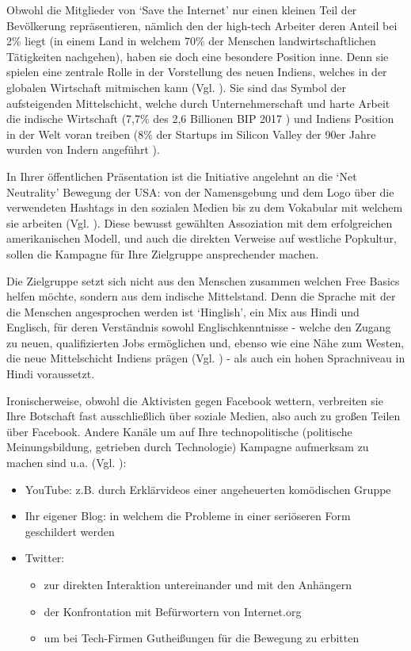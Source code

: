 \documentclass{article}
\begin{document}
\medskip

Obwohl die Mitglieder von `Save the Internet' nur einen kleinen Teil der Bevölkerung repräsentieren, nämlich den der high-tech Arbeiter deren Anteil bei 2\% liegt (in einem Land in welchem 70\% der Menschen landwirtschaftlichen Tätigkeiten nachgehen), haben sie doch eine besondere Position inne. Denn sie spielen eine zentrale Rolle in der Vorstellung des neuen Indiens, welches in der globalen Wirtschaft mitmischen kann (Vgl. \cite{thomas2012}).
Sie sind das Symbol der aufsteigenden Mittelschicht, welche durch Unternehmerschaft und harte Arbeit die indische Wirtschaft (7,7\% des 2,6 Billionen BIP 2017 \autocite{statistaIndiaGDP}\autocite{imfIndiaGDP}) und Indiens Position in der Welt voran treiben (8\% der Startups im Silicon Valley der 90er Jahre wurden von Indern angeführt \parencite{upadhya2004}).

\medskip

In Ihrer öffentlichen Präsentation ist die Initiative angelehnt an die `Net Neutrality' Bewegung der USA: von der Namensgebung und dem Logo über die verwendeten Hashtags in den sozialen Medien bis zu dem Vokabular mit welchem sie arbeiten (Vgl. \cite{prasad2017}).
Diese bewusst gewählten Assoziation mit dem erfolgreichen amerikanischen Modell, und auch die direkten Verweise auf westliche Popkultur, sollen die Kampagne für Ihre Zielgruppe ansprechender machen.

Die Zielgruppe setzt sich nicht aus den Menschen zusammen welchen Free Basics helfen möchte, sondern aus dem indische Mittelstand. Denn die Sprache mit der die Menschen angesprochen werden ist `Hinglish', ein Mix aus Hindi und Englisch, für deren Verständnis sowohl Englischkenntnisse - welche den Zugang zu neuen, qualifizierten Jobs ermöglichen und, ebenso wie eine Nähe zum Westen, die neue Mittelschicht Indiens prägen (Vgl. \cite{fernandes2006}) - als auch ein hohen Sprachniveau in Hindi voraussetzt.

\medskip

Ironischerweise, obwohl die Aktivisten gegen Facebook wettern, verbreiten sie Ihre Botschaft fast ausschließlich über soziale Medien, also auch zu großen Teilen über Facebook. Andere Kanäle um auf Ihre technopolitische (politische Meinungsbildung, getrieben durch Technologie) Kampagne aufmerksam zu machen sind u.a. (Vgl. \cite{prasad2017}):
\begin{itemize}
  \item YouTube: z.B. durch Erklärvideos einer angeheuerten komödischen Gruppe
  \item Ihr eigener Blog: in welchem die Probleme in einer seriöseren Form geschildert werden
  \item Twitter:
    \begin{itemize}
      \item zur direkten Interaktion untereinander und mit den Anhängern
      \item der Konfrontation mit Befürwortern von Internet.org
      \item um bei Tech-Firmen Gutheißungen für die Bewegung zu erbitten
    \end{itemize}
\end{itemize}
\end{document}
